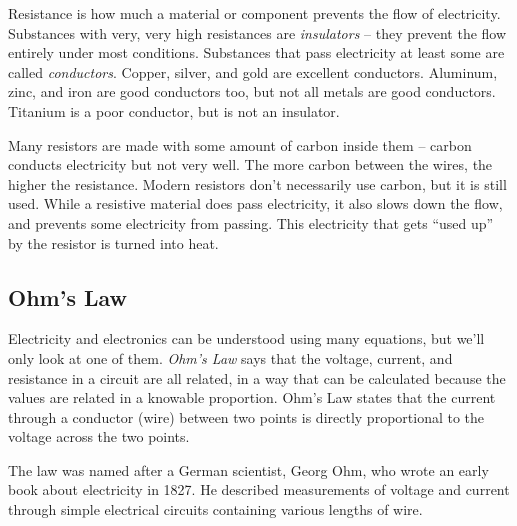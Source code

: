 Resistance is how much a material or component prevents the flow of electricity. Substances with very, very high resistances are \emph{insulators} -- they prevent the flow entirely under most conditions. Substances that pass electricity at least some are called \emph{conductors}. Copper, silver, and gold are excellent conductors. Aluminum, zinc, and iron are good conductors too, but not all metals are good conductors. Titanium is a poor conductor, but is not an insulator. 

Many resistors are made with some amount of carbon inside them -- carbon conducts electricity but not very well. The more carbon between the wires, the higher the resistance. Modern resistors don't necessarily use carbon, but it is still used. While a resistive material does pass electricity, it also slows down the flow, and prevents some electricity from passing. This electricity that gets ``used up'' by the resistor is turned into heat. 


\subsection*{Ohm's Law}

Electricity and electronics can be understood using many equations, but we'll only look at one of them. \emph{Ohm's Law} says that the voltage, current, and resistance in a circuit are all related, in a way that can be calculated because the values are related in a knowable proportion. Ohm's Law states that the current through a conductor (wire) between two points is directly proportional to the voltage across the two points.

The law was named after a German scientist, Georg Ohm, who wrote an early book about electricity in  1827. He described measurements of voltage and current through simple electrical circuits containing various lengths of wire.

